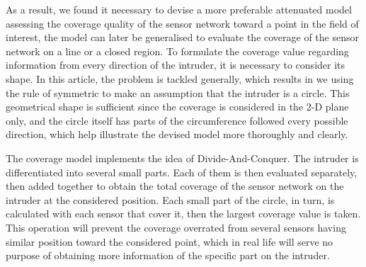 \documentclass[3p]{elsarticle}
\begin{document}
%
As a result, we found it necessary to devise a more preferable attenuated model assessing the coverage quality of the sensor network toward a point in the field of interest, the model can later be generalised to evaluate the coverage of the sensor network on a line or a closed region. To formulate the coverage value regarding information from every direction of the intruder, it is necessary to consider its shape. In this article, the problem is tackled generally, which results in we using the rule of symmetric to make an assumption that the intruder is a circle. This geometrical shape is sufficient since the coverage is considered in the 2-D plane only, and the circle itself has parts of the circumference followed every possible direction, which help illustrate the devised model more thoroughly and clearly.\par
%
The coverage model implements the idea of Divide-And-Conquer. The intruder is differentiated into several small parts. Each of them is then evaluated separately, then added together to obtain the total coverage of the sensor network on the intruder at the considered position. Each small part of the circle, in turn, is calculated with each sensor that cover it, then the largest coverage value is taken. This operation will prevent the coverage overrated from several sensors having similar position toward the considered point, which in real life will serve no purpose of obtaining more information of the specific part on the intruder. 
\end{document}
